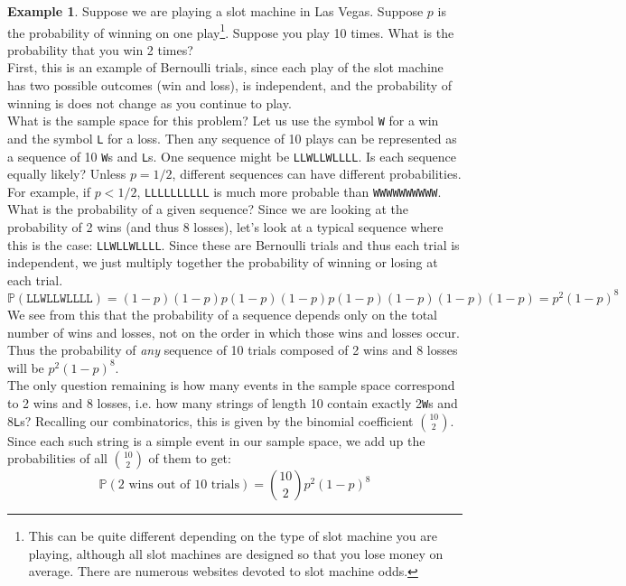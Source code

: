 \documentclass[12pt]{article}
\theoremstyle{definition}
\newtheorem*{example}{Example}
\theoremstyle{remark}
\def\P{{\mathbb P}}
\begin{document}
\begin{example}Suppose we are playing a slot machine in Las Vegas. Suppose $p$ is the probability of winning on one play\footnote{This can be quite different depending on the type of slot machine you are playing, although all slot machines are designed so that you lose money on average. There are numerous websites devoted to slot machine odds.}. Suppose you play 10 times. What is the probability that you win 2 times?\\

First, this is an example of Bernoulli trials, since each play of the slot machine has two possible outcomes (win and loss), is independent, and the probability of winning is does not change as you continue to play. \\

What is the sample space for this problem? Let us use the symbol \texttt{W} for a win and the symbol \texttt{L} for a loss. Then any sequence of 10 plays can be represented as a sequence of 10 \texttt{W}s and \texttt{L}s. One sequence might be \texttt{LLWLLWLLLL}. Is each sequence equally likely? Unless $p = 1/2$, different sequences can have different probabilities. For example, if $p < 1/2$, \texttt{LLLLLLLLLL} is much more probable than \texttt{WWWWWWWWWW}. What is the probability of a given sequence? Since we are looking at the probability of 2 wins (and thus 8 losses), let's look at a typical sequence where this is the case: \texttt{LLWLLWLLLL}. Since these are Bernoulli trials and thus each trial is independent, we just multiply together the probability of winning or losing at each trial.
\[
\P(\texttt{LLWLLWLLLL}) = (1-p)(1-p)p(1-p)(1-p)p(1-p)(1-p)(1-p)(1-p) = p^2(1-p)^8
\]
We see from this that the probability of a sequence depends only on the total number of wins and losses, not on the order in which those wins and losses occur. Thus the probability of \emph{any} sequence of 10 trials composed of 2 wins and 8 losses will be $p^2(1-p)^8$.\\

The only question remaining is how many events in the sample space correspond to 2 wins and 8 losses, i.e. how many strings of length 10 contain exactly 2\texttt{W}s and 8\texttt{L}s? Recalling our combinatorics, this is given by the binomial coefficient $\binom{10}{2}$. Since each such string is a simple event in our sample space, we add up the probabilities of all $\binom{10}{2}$ of them to get:
\[
\P(\text{2 wins out of 10 trials})= \binom{10}{2} p^2 (1-p)^8
\]  
\end{example}
\end{document}
